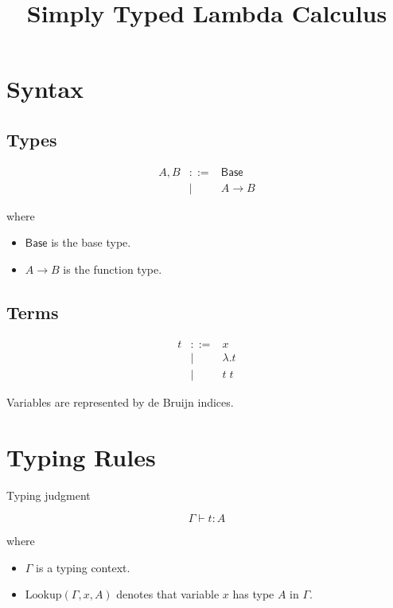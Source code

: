 \documentclass[a4paper,11pt]{article}
\title{Simply Typed Lambda Calculus}
\author{}
\date{}
\begin{document}
    \maketitle

    \section{Syntax}

    \subsection{Types}

    \[
        \begin{array}{rcl}
            A,B & ::= & \mathsf{Base} \\
            & \mid & A \rightarrow B
        \end{array}
    \]

    where

    \begin{itemize}
        \item $\mathsf{Base}$ is the base type.
        \item $A \rightarrow B$ is the function type.
    \end{itemize}

    \subsection{Terms}

    \[
        \begin{array}{rcl}
            t & ::= & x \\
            & \mid & \lambda.t \\
            & \mid & t\;t
        \end{array}
    \]

    Variables are represented by de Bruijn indices.

    \section{Typing Rules}

    Typing judgment

    \[
        \Gamma \vdash t : A
    \]

    where

    \begin{itemize}
        \item $\Gamma$ is a typing context.
        \item $\mathrm{Lookup}(\Gamma,x,A)$ denotes that
        variable $x$ has type $A$ in $\Gamma$.
    \end{itemize}
\end{document}
